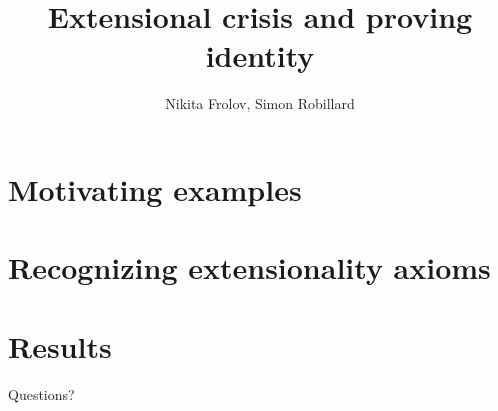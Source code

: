 \documentclass[14pt]{beamer}
\title{Extensional crisis and proving identity}
\author{Nikita Frolov, Simon Robillard}
\institute{}
\date{}
\begin{document}
\begin{frame}
  \maketitle
\end{frame}

\section{Motivating examples}


\section{Recognizing extensionality axioms}


\section{Results}


\begin{frame}
  \begin{center}
    \Huge{Questions?}
  \end{center}
\end{frame}
\end{document}

